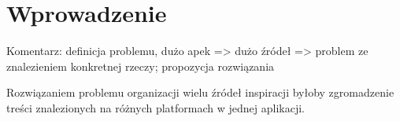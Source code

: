 \chapter{Wprowadzenie}

Komentarz: definicja problemu, dużo apek => dużo źródeł => problem ze znalezieniem konkretnej rzeczy; propozycja rozwiązania

Rozwiązaniem problemu organizacji wielu źródeł inspiracji byłoby zgromadzenie treści znalezionych 
na różnych platformach w jednej aplikacji.